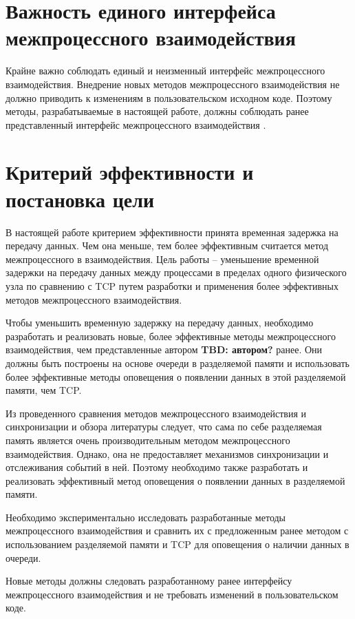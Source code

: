 \section{Важность единого интерфейса межпроцессного взаимодействия}

Крайне важно соблюдать единый и неизменный интерфейс межпроцессного взаимодействия. Внедрение новых методов межпроцессного взаимодействия не должно приводить к изменениям в пользовательском исходном коде. Поэтому методы, разрабатываемые в настоящей работе, должны соблюдать ранее представленный интерфейс межпроцессного взаимодействия \cite{GubarevKMU18}.

\finishrelatedwork

\section{Критерий эффективности и постановка цели}

В настоящей работе критерием эффективности принята временная задержка на передачу данных. Чем она меньше, тем более эффективным считается метод межпроцессного в взаимодействия.
Цель работы -- уменьшение временной задержки на передачу данных между процессами в пределах одного физического узла по сравнению с TCP путем разработки и применения более эффективных методов межпроцессного взаимодействия.

Чтобы уменьшить временную задержку на передачу данных, необходимо разработать и реализовать новые, более эффективные методы межпроцессного взаимодействия, чем представленные автором \textbf{TBD: автором?} ранее. Они должны быть построены на основе очереди в разделяемой памяти и использовать более эффективные методы оповещения о появлении данных в этой разделяемой памяти, чем TCP.

Из проведенного сравнения методов межпроцессного взаимодействия и синхронизации и обзора литературы следует, что сама по себе разделяемая память является очень производительным методом межпроцессного взаимодействия. Однако, она не предоставляет механизмов синхронизации и отслеживания событий в ней. Поэтому необходимо также разработать и реализовать эффективный метод оповещения о появлении данных в разделяемой памяти.

Необходимо экспериментально исследовать разработанные методы межпроцессного взаимодействия и сравнить их с предложенным ранее методом с использованием разделяемой памяти и TCP для оповещения о наличии данных в очереди.

Новые методы должны следовать разработанному ранее интерфейсу межпроцессного взаимодействия и не требовать изменений в пользовательском коде.